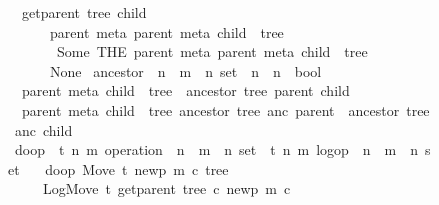 \documentclass[10pt,journal,compsoc]{IEEEtran}
\renewcommand{\isacartoucheopen}{}
\renewcommand{\isacartoucheclose}{}
\begin{document}
\begin{figure}
\begin{isabellebody}
\ \ {\isacartoucheopen}get{\isacharunderscore}parent\ tree\ child\ {\isasymequiv}\isanewline
\ \ \ \ \ \ {\isasymexists}{\isacharbang}parent{\isachardot}\ {\isasymexists}{\isacharbang}meta{\isachardot}\ {\isacharparenleft}parent{\isacharcomma}\ meta{\isacharcomma}\ child{\isacharparenright}\ {\isasymin}\ tree\ \isanewline
\ \ \ \ \ \ \ {\rm Some}\ {\isacharparenleft}{\rm THE}\ {\isacharparenleft}parent{\isacharcomma}\ meta{\isacharparenright}{\isachardot}\ {\isacharparenleft}parent{\isacharcomma}\ meta{\isacharcomma}\ child{\isacharparenright}\ {\isasymin}\ tree{\isacharparenright}\isanewline
\ \ \ \ \ \ {\rm None}{\isacartoucheclose}\isanewline
\isanewline
{}\isamarkupfalse%
\ ancestor\ {\isacharcolon}{\isacharcolon}\ {\isacartoucheopen}{\isacharparenleft}{\isacharprime}n\ {\isasymtimes}\ {\isacharprime}m\ {\isasymtimes}\ {\isacharprime}n{\isacharparenright}\ set\ {\isasymRightarrow}\ {\isacharprime}n\ {\isasymRightarrow}\ {\isacharprime}n\ {\isasymRightarrow}\ bool{\isacartoucheclose}\ \isanewline
\ \ {\isacartoucheopen}{\isasymlbrakk}{\isacharparenleft}parent{\isacharcomma}\ meta{\isacharcomma}\ child{\isacharparenright}\ {\isasymin}\ tree{\isasymrbrakk}\ {\isasymLongrightarrow}\ ancestor\ tree\ parent\ child{\isacartoucheclose}\ {\isacharbar}\isanewline
\ \ {\isacartoucheopen}{\isasymlbrakk}{\isacharparenleft}parent{\isacharcomma}\ meta{\isacharcomma}\ child{\isacharparenright}\ {\isasymin}\ tree{\isacharsemicolon}\ ancestor\ tree\ anc\ parent{\isasymrbrakk}\ {\isasymLongrightarrow}\ ancestor\ tree\ anc\ child{\isacartoucheclose}\isanewline
\isanewline
{}\isamarkupfalse%
\ do{\isacharunderscore}op\ {\isacharcolon}{\isacharcolon}\ {\isacartoucheopen}{\isacharparenleft}{\isacharprime}t{\isacharcomma}\ {\isacharprime}n{\isacharcomma}\ {\isacharprime}m{\isacharparenright}\ operation\ {\isasymtimes}\ {\isacharparenleft}{\isacharprime}n\ {\isasymtimes}\ {\isacharprime}m\ {\isasymtimes}\ {\isacharprime}n{\isacharparenright}\ set\ {\isasymRightarrow}\ {\isacharparenleft}{\isacharprime}t{\isacharcomma}\ {\isacharprime}n{\isacharcomma}\ {\isacharprime}m{\isacharparenright}\ log{\isacharunderscore}op\ {\isasymtimes}\ {\isacharparenleft}{\isacharprime}n\ {\isasymtimes}\ {\isacharprime}m\ {\isasymtimes}\ {\isacharprime}n{\isacharparenright}\ set{\isacartoucheclose}\ \isanewline
\ \ {\isacartoucheopen}do{\isacharunderscore}op\ {\isacharparenleft}{\rm Move}\ t\ newp\ m\ c{\isacharcomma}\ tree{\isacharparenright}\ {\isacharequal}\isanewline
\ \ \ \ \ {\isacharparenleft}{\rm LogMove}\ t\ {\isacharparenleft}get{\isacharunderscore}parent\ tree\ c{\isacharparenright}\ newp\ m\ c{\isacharcomma}\isanewline

\end{isabellebody}
\end{figure}
\end{document}
